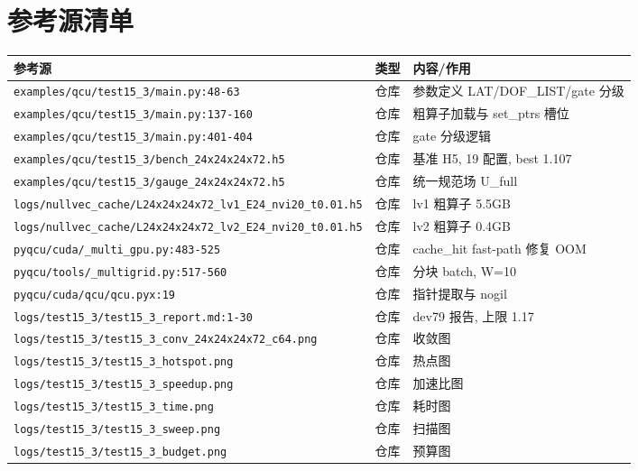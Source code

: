 \documentclass[UTF8]{ctexart}
\begin{document}
\section{参考源清单}
\begin{xltabular}{\textwidth}{llX}
\toprule
\textcolor{evidence}{参考源} & 类型 & 内容/作用 \\
\midrule
\endhead
\texttt{\nolinkurl{examples/qcu/test15_3/main.py:48-63}} & 仓库 & 参数定义 LAT/DOF\_LIST/gate 分级 \\
\texttt{\nolinkurl{examples/qcu/test15_3/main.py:137-160}} & 仓库 & 粗算子加载与 set\_ptrs 槽位 \\
\texttt{\nolinkurl{examples/qcu/test15_3/main.py:401-404}} & 仓库 & gate 分级逻辑 \\
\texttt{\nolinkurl{examples/qcu/test15_3/bench_24x24x24x72.h5}} & 仓库 & 基准 H5, 19 配置, best 1.107 \\
\texttt{\nolinkurl{examples/qcu/test15_3/gauge_24x24x24x72.h5}} & 仓库 & 统一规范场 U\_full \\
\texttt{\nolinkurl{logs/nullvec_cache/L24x24x24x72_lv1_E24_nvi20_t0.01.h5}} & 仓库 & lv1 粗算子 5.5GB \\
\texttt{\nolinkurl{logs/nullvec_cache/L24x24x24x72_lv2_E24_nvi20_t0.01.h5}} & 仓库 & lv2 粗算子 0.4GB \\
\texttt{\nolinkurl{pyqcu/cuda/_multi_gpu.py:483-525}} & 仓库 & cache\_hit fast-path 修复 OOM \\
\texttt{\nolinkurl{pyqcu/tools/_multigrid.py:517-560}} & 仓库 & 分块 batch, W=10 \\
\texttt{\nolinkurl{pyqcu/cuda/qcu/qcu.pyx:19}} & 仓库 & 指针提取与 nogil \\
\texttt{\nolinkurl{logs/test15_3/test15_3_report.md:1-30}} & 仓库 & dev79 报告, 上限 1.17 \\
\texttt{\nolinkurl{logs/test15_3/test15_3_conv_24x24x24x72_c64.png}} & 仓库 & 收敛图 \\
\texttt{\nolinkurl{logs/test15_3/test15_3_hotspot.png}} & 仓库 & 热点图 \\
\texttt{\nolinkurl{logs/test15_3/test15_3_speedup.png}} & 仓库 & 加速比图 \\
\texttt{\nolinkurl{logs/test15_3/test15_3_time.png}} & 仓库 & 耗时图 \\
\texttt{\nolinkurl{logs/test15_3/test15_3_sweep.png}} & 仓库 & 扫描图 \\
\texttt{\nolinkurl{logs/test15_3/test15_3_budget.png}} & 仓库 & 预算图 \\

\end{xltabular}
\end{document}
